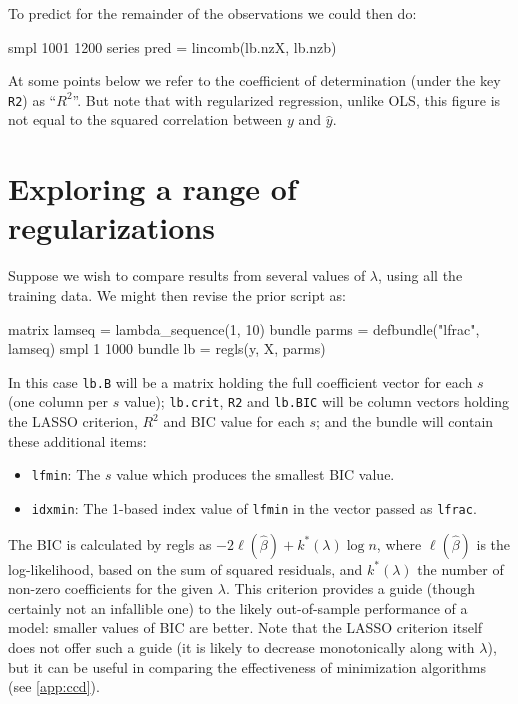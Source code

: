 \documentclass{article}
\begin{document}
To predict for the remainder of the observations we could then do:
\begin{code}
smpl 1001 1200
series pred = lincomb(lb.nzX, lb.nzb)
\end{code}

At some points below we refer to the coefficient of determination
(under the key \texttt{R2}) as ``$R^2$''. But note that with
regularized regression, unlike OLS, this figure is not equal to the
squared correlation between $y$ and $\hat{y}$.

\section{Exploring a range of regularizations}
\label{sec:simple-search}

Suppose we wish to compare results from several values of $\lambda$,
using all the training data. We might then revise the prior script as:
\begin{code}
matrix lamseq = lambda_sequence(1, 10)
bundle parms = defbundle("lfrac", lamseq)
smpl 1 1000
bundle lb = regls(y, X, parms)
\end{code}

In this case \texttt{lb.B} will be a matrix holding the full
coefficient vector for each $s$ (one column per $s$ value);
\texttt{lb.crit}, \texttt{R2} and \texttt{lb.BIC} will be column
vectors holding the LASSO criterion, $R^2$ and BIC value for each
$s$; and the bundle will contain these additional items:
\begin{itemize}
\item \texttt{lfmin}: The $s$ value which produces the smallest BIC
  value.
\item \texttt{idxmin}: The 1-based index value of \texttt{lfmin} in
  the vector passed as \texttt{lfrac}.
\end{itemize}

The BIC \citep{schwarz78} is calculated by \textsf{regls} as
$-2\ell(\hat{\beta}) + k^*(\lambda) \log n$, where $\ell(\hat{\beta})$
is the log-likelihood, based on the sum of squared residuals, and
$k^*(\lambda)$ the number of non-zero coefficients for the given
$\lambda$. This criterion provides a guide (though certainly not an
infallible one) to the likely out-of-sample performance of a model:
smaller values of BIC are better. Note that the LASSO criterion itself
does not offer such a guide (it is likely to decrease monotonically
along with $\lambda$), but it can be useful in comparing the
effectiveness of minimization algorithms (see \ref{app:ccd}).
\end{document}
